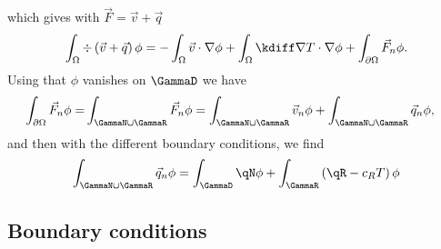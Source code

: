%
which gives with $\vec{F}=\vec{v} + \vec{q}$%
\begin{align*}
\int_{\Omega} \div\left(\vec{v} + \vec{q}\right)\phi = -\int_{\Omega}\vec{v}\cdot\nabla\phi
+ \int_{\Omega}\kdiff\nabla T\cdot\nabla\phi+ \int_{\partial\Omega} \vec{F}_n\phi.
\end{align*}
%
Using that $\phi$ vanishes on $\GammaD$ we have
%
\begin{align*}
\int_{\partial\Omega} \vec{F}_n\phi =& \int_{\GammaN\cup\GammaR} \vec{F}_n\phi
= \int_{\GammaN\cup\GammaR} \vec{v}_n\phi + \int_{\GammaN\cup\GammaR} \vec{q}_n\phi,
\end{align*}
%
and then with the different boundary conditions, we find
%
\begin{align*}
\int_{\GammaN\cup\GammaR} \vec{q}_n\phi = \int_{\GammaD} \qN\phi + \int_{\GammaR}\left(\qR - c_R T\right)\phi
\end{align*}
%
%
\subsection{Boundary conditions}\label{subsec:}
%
%
